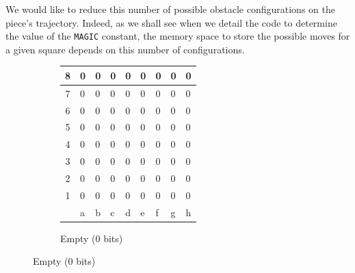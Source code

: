 \documentclass[12pt,a4paper,twoside,openright]{book}
\begin{document}
We would like to reduce this number of possible obstacle configurations on the piece's trajectory. Indeed, as we shall see when we detail the code to determine the value of the \texttt{MAGIC} constant, the memory space to store the possible moves for a given square depends on this number of configurations.\\

\begin{figure}[htpb]
\centering
\begin{subfigure}[b]{0.45\textwidth}
\centering
\begin{tabular}{|c|*{8}{>{\centering\arraybackslash}p{0.3cm}|}}
\hline
{\scriptsize 8} & \tiny 0 & \tiny 0 & \tiny 0 & \tiny 0 & \tiny 0 & \tiny 0 & \tiny 0 & \tiny 0 \\[2pt] \hline
{\scriptsize 7} & \tiny 0 & \tiny 0 & \tiny 0 & \tiny 0 & \tiny 0 & \tiny 0 & \tiny 0 & \tiny 0 \\[2pt] \hline
{\scriptsize 6} & \tiny 0 & \tiny 0 & \tiny 0 & \tiny 0 & \tiny 0 & \tiny 0 & \tiny 0 & \tiny 0 \\[2pt] \hline
{\scriptsize 5} & \tiny 0 & \tiny 0 & \tiny 0 & \tiny 0 & \tiny 0 & \tiny 0 & \tiny 0 & \tiny 0 \\[2pt] \hline
{\scriptsize 4} & \tiny 0 & \tiny 0 & \tiny 0 & \tiny 0 & \tiny 0 & \tiny 0 & \tiny 0 & \tiny 0 \\[2pt] \hline
{\scriptsize 3} & \tiny 0 & \tiny 0 & \tiny 0 & \cellcolor{lightgray}\tiny 0 & \tiny 0 & \tiny 0 & \tiny 0 & \tiny 0 \\[2pt] \hline
{\scriptsize 2} & \tiny 0 & \tiny 0 & \tiny 0 & \tiny 0 & \tiny 0 & \tiny 0 & \tiny 0 & \tiny 0 \\[2pt] \hline
{\scriptsize 1} & \tiny 0 & \tiny 0 & \tiny 0 & \tiny 0 & \tiny 0 & \tiny 0 & \tiny 0 & \tiny 0 \\[2pt] \hline
\multicolumn{1}{c|}{} & \scriptsize a & \scriptsize b & \scriptsize c & \scriptsize d & \scriptsize e & \scriptsize f & \scriptsize g & \scriptsize h \\
\cline{2-9}
\end{tabular}
\caption{Empty (0 bits)}
\end{subfigure}
\hfill

\end{figure}
\end{document}
